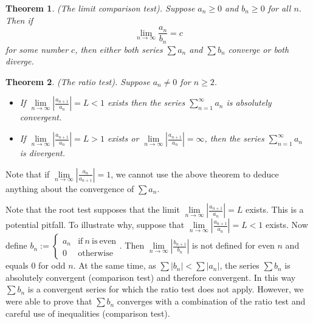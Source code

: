 \documentclass[12pt]{book}
\newtheorem{theorem}{Theorem}[section]
\newcommand{\doublebrace}[4]{\left\{\begin{array}{ll} #1 & #2 \\#3 & #4  \end{array} \right.}
\begin{document}
\begin{theorem}\label{thSeriesTwoSeriesRatioTest}
(The limit comparison test). Suppose $a_n\geq 0$ and $b_n\geq 0$ for all $n$. Then if 
\[\lim\limits_{n\to \infty} \frac{a_n}{b_n}= c 
\]
for some number $c$, then either both series $\sum a_n$ and $\sum b_n $ converge or both diverge.
\end{theorem}

\begin{theorem}\label{thRatioTest}(The ratio test).  Suppose $a_n\neq 0$ for $n\geq 2$. 
\begin{itemize}
\item If $\lim\limits_{n\to\infty}\left|\frac{a_{n+1}}{a_{n}}\right|= L<1$ exists then the series $\sum\limits_{n=1}^\infty a_n$ is absolutely convergent.
\item If $\lim\limits_{n\to\infty}\left|\frac{a_{n+1}}{a_{n}}\right|= L>1$ exists or $\lim\limits_{n\to\infty} \left|\frac{a_{n+1}}{a_{n}}\right| =\infty$, then the series $\sum\limits_{n=1}^\infty a_n$ is divergent.
\end{itemize}
\end{theorem}
Note that if $\lim\limits_{n\to\infty}\left|\frac{a_n}{a_{n+1}}\right|=1$, we cannot use the above theorem to deduce anything about the convergence of $\sum a_n$.

Note that the root test supposes that the limit $\lim\limits_{n\to\infty} \left|\frac{a_{n+1}}{a_{n}}\right| =L$ exists. This is a potential pitfall. To illustrate why, suppose that $\lim\limits_{n\to\infty} \left|\frac{a_{n+1}}{a_{n}}\right| =L<1$ exists. Now define $b_n:=\doublebrace{a_n}{\mathrm{if~}n~\mathrm{is~even}}{0}{\mathrm{otherwise}}$. Then $\lim \limits_{n\to\infty} \left|\frac{b_{n+1}}{b_{n}}\right|$ is not defined for even $n$ and equals 0 for odd $n$. At the same time, as $\sum |b_n|<\sum |a_n|$, the series $\sum b_n$ is absolutely convergent (comparison test) and therefore convergent. In this way $\sum b_n$ is a convergent series for which the ratio test does not apply. However, we were able to prove that $\sum b_n$ converges with a combination of the ratio test and careful use of inequalities (comparison test).
\end{document}
